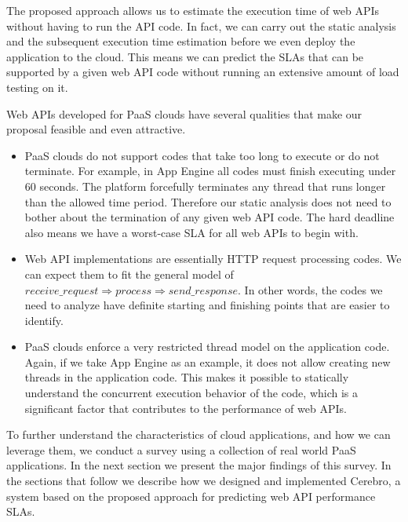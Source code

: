 The proposed approach allows us to estimate the execution time of web APIs without having to
run the API code.
In fact, we can carry out the static analysis and the subsequent execution time
estimation before we even deploy the application to the cloud. 
This means we can predict the SLAs that can be supported by a given web API code
without running an extensive amount of load testing on it. 

Web APIs developed for PaaS clouds have several qualities that make our proposal
feasible and even attractive.

\begin{itemize}
\item PaaS clouds do not support codes that take too long to execute or do not terminate. For 
example, in App Engine all codes must finish executing under 60 seconds.
The platform forcefully terminates any thread that runs longer than the allowed time period.
Therefore our static analysis does not need to bother about the termination of any given web API
code. The hard deadline also means we have a worst-case SLA for all web APIs to begin with.
\item Web API implementations are essentially HTTP request processing codes. We can expect them
to fit the general model of $receive\_request \Rightarrow process \Rightarrow send\_response$. In
other words, the codes we need to analyze have definite starting and finishing points that are easier
to identify.
\item PaaS clouds enforce a very restricted thread model on the application code. Again, if we take
App Engine as an example, it does not allow creating new threads in the application code. This
makes it possible to statically understand the concurrent execution behavior of the code, which is a significant
factor that contributes to the performance of web APIs.
\end{itemize}

To further understand the characteristics of cloud applications, and how we can leverage them,
we conduct a survey
using a collection of real world PaaS applications. In the next section we present the major findings
of this survey.
In the sections that follow we describe how we designed and implemented Cerebro, a system based on
the proposed approach for predicting web API performance SLAs.